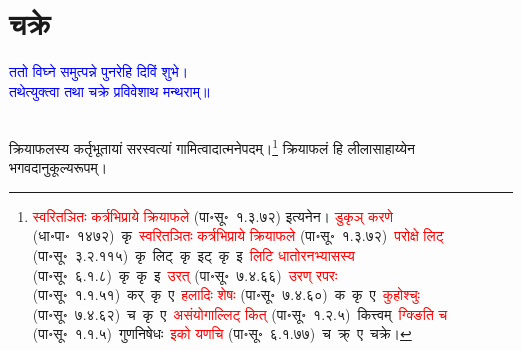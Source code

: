 \section[चक्रे]{चक्रे}
\centering\textcolor{blue}{ततो विघ्ने समुत्पन्ने पुनरेहि दिविं शुभे।\nopagebreak\\
तथेत्युक्त्वा तथा चक्रे प्रविवेशाथ मन्थराम्॥}\nopagebreak\\
\\
\fontsize{14}{21}\selectfont\begin{sloppypar}\justifying\noindent\hspace{10mm} क्रियाफलस्य कर्तृ\-भूतायां सरस्वत्यां गामित्वादात्मनेपदम्।\footnote{\textcolor{red}{स्वरितञितः कर्त्रभिप्राये क्रियाफले} (पा॰सू॰~१.३.७२) इत्यनेन। \textcolor{red}{डुकृञ् करणे} (धा॰पा॰~१४७२)~\arrow कृ~\arrow \textcolor{red}{स्वरितञितः कर्त्रभिप्राये क्रियाफले} (पा॰सू॰~१.३.७२)~\arrow \textcolor{red}{परोक्षे लिट्} (पा॰सू॰~३.२.११५)~\arrow कृ~लिट्~\arrow कृ~इट्~\arrow कृ~इ~\arrow \textcolor{red}{लिटि धातोरनभ्यासस्य} (पा॰सू॰~६.१.८)~\arrow कृ~कृ~इ~\arrow \textcolor{red}{उरत्‌} (पा॰सू॰~७.४.६६)~\arrow \textcolor{red}{उरण् रपरः} (पा॰सू॰~१.१.५१)~\arrow कर्~कृ~ए~\arrow \textcolor{red}{हलादिः शेषः} (पा॰सू॰~७.४.६०)~\arrow क~कृ~ए~\arrow \textcolor{red}{कुहोश्चुः} (पा॰सू॰~७.४.६२)~\arrow च~कृ~ए~\arrow \textcolor{red}{असंयोगाल्लिट् कित्} (पा॰सू॰~१.२.५)~\arrow कित्त्वम्~\arrow \textcolor{red}{ग्क्ङिति च} (पा॰सू॰~१.१.५)~\arrow गुणनिषेधः~\arrow \textcolor{red}{इको यणचि} (पा॰सू॰~६.१.७७)~\arrow च~क्र्~ए~\arrow चक्रे।} क्रिया\-फलं हि लीला\-साहाय्येन भगवदानुकूल्य\-रूपम्।\end{sloppypar}
